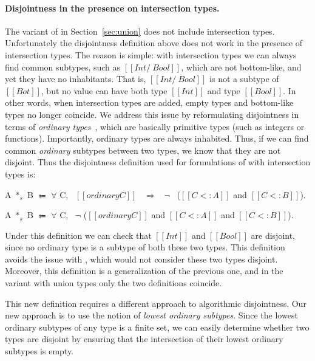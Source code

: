 \paragraph{Disjointness in the presence on intersection types.}
The variant of \cal in Section~\ref{sec:union} does not include intersection types.
Unfortunately the disjointness definition above does not work in the presence of
intersection types. The reason is simple: with intersection types we can always find
common subtypes, such as $[[Int /\ Bool]]$, which are not bottom-like, and yet
they have no inhabitants. That is,
$[[Int /\ Bool]]$ is not a subtype of $[[Bot]]$, but no value can have both type
$[[Int]]$ and type $[[Bool]]$. In other words, when intersection types are added, empty types
and bottom-like types no longer coincide. We address this issue by reformulating
disjointness in terms of \textit{ordinary types}~\cite{davies2000intersection}, which are basically primitive types
(such as integers or functions). Importantly, ordinary types are always inhabited.
Thus, if we can find common \emph{ordinary} subtypes between two types, we know that they
are not disjoint. Thus the disjointness definition used for formulations
of \name with intersection types is:

\begin{definition}
\label{def:inter:disj}
  A $*_s$ B $\Coloneqq$ $\forall$ C, \ $[[ordinary C]]$ \ $\Longrightarrow$ \ $\neg$ \ ($[[C <: A]]$ and $[[C <: B]]$).
\end{definition}


\begin{definition}
\label{def:inter:disj}
  A $*_s$ B $\Coloneqq$ $\forall$ C, \ $\neg$ ($[[ordinary C]]$ and $[[C <: A]]$ and $[[C <: B]]$).
\end{definition}

\noindent Under this definition we can check that $[[Int]]$ and $[[Bool]]$ are disjoint,
since no ordinary type is a subtype of both these two types. This definition avoids
the issue with , which would not consider these two types disjoint.
Moreover, this definition is a generalization of the previous one, and in the
variant with union types only the two definitions coincide.

This new definition requires a different approach to algorithmic disjointness. Our new
approach is to use the notion of \emph{lowest ordinary subtypes}. Since the lowest ordinary
subtypes of any type is a finite set, we can easily determine whether two types are disjoint
by ensuring that the intersection of their lowest ordinary subtypes is empty.

